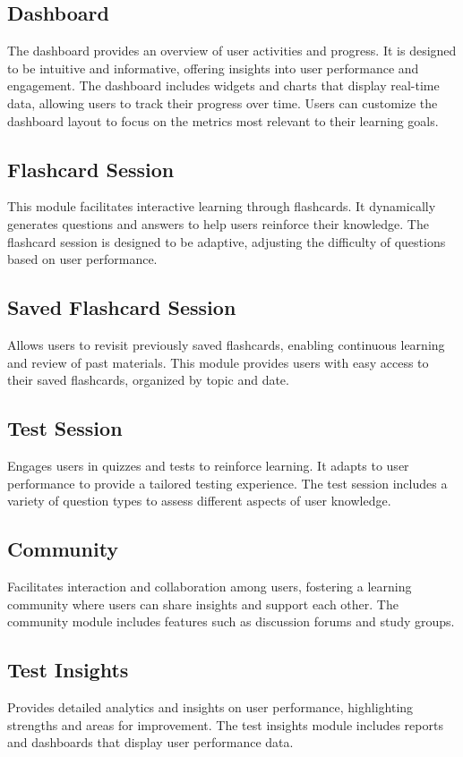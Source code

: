 \documentclass{report}
\begin{document}
\subsection{Dashboard}
The dashboard provides an overview of user activities and progress. It is designed to be intuitive and informative, offering insights into user performance and engagement. The dashboard includes widgets and charts that display real-time data, allowing users to track their progress over time. Users can customize the dashboard layout to focus on the metrics most relevant to their learning goals.

\subsection{Flashcard Session}
This module facilitates interactive learning through flashcards. It dynamically generates questions and answers to help users reinforce their knowledge. The flashcard session is designed to be adaptive, adjusting the difficulty of questions based on user performance.

\subsection{Saved Flashcard Session}
Allows users to revisit previously saved flashcards, enabling continuous learning and review of past materials. This module provides users with easy access to their saved flashcards, organized by topic and date.

\subsection{Test Session}
Engages users in quizzes and tests to reinforce learning. It adapts to user performance to provide a tailored testing experience. The test session includes a variety of question types to assess different aspects of user knowledge.

\subsection{Community}
Facilitates interaction and collaboration among users, fostering a learning community where users can share insights and support each other. The community module includes features such as discussion forums and study groups.

\subsection{Test Insights}
Provides detailed analytics and insights on user performance, highlighting strengths and areas for improvement. The test insights module includes reports and dashboards that display user performance data.
\end{document}
